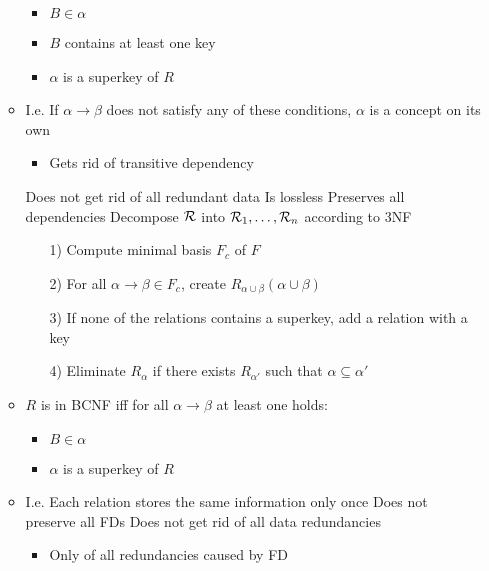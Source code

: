 \begin{itemize}
\begin{itemize}
\begin{itemize}
                    \item $B \in \alpha$
                    \item $B$ contains at least one key
                    \item $\alpha$ is a superkey of $R$
                \end{itemize}
            \item I.e. If $\alpha \to \beta$ does not satisfy any of these conditions, $\alpha$ is a concept on its own
                \begin{itemize}
                    \item Gets rid of transitive dependency
                \end{itemize}
            \icon Does not get rid of all redundant data
            \ipro Is lossless
            \ipro Preserves all dependencies
             Decompose $\mathcal{R}$ into $\mathcal{R}_1, \dots, \mathcal{R}_n$ according to 3NF
                \begin{itemize}
                    \item[1)] Compute minimal basis $F_c$ of $F$
                    \item[2)] For all $\alpha \to \beta \in F_c$, create $R_{\alpha \cup \beta}(\alpha \cup \beta)$
                    \item[3)] If none of the relations contains a superkey, add a relation with a key
                    \item[4)] Eliminate $R_\alpha$ if there exists $R_{\alpha'}$ such that $\alpha \subseteq \alpha'$
                \end{itemize} 
        \end{itemize}
        \begin{itemize}
            \item $R$ is in BCNF iff for all $\alpha \to \beta$ at least one holds:
                \begin{itemize}
                    \item $B \in \alpha$
                    \item $\alpha$ is a superkey of $R$
                \end{itemize}
            \item I.e. Each relation stores the same information only once
            \icon Does not preserve all FDs
            \icon Does not get rid of all data redundancies
                \begin{itemize}
                    \item Only of all redundancies caused by FD

\end{itemize}
\end{itemize}
\end{itemize}
